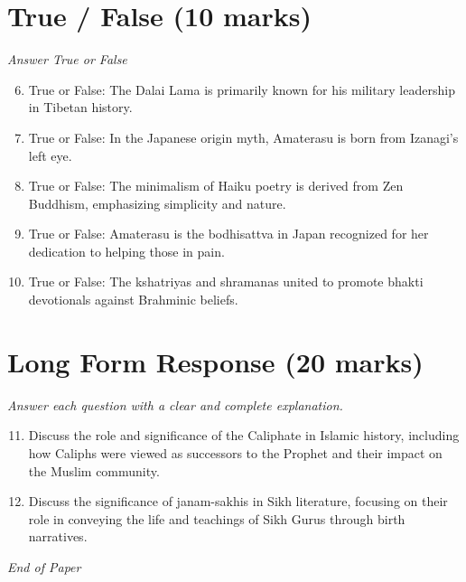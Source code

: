 \documentclass[12pt]{article}
\begin{document}
\section*{True / False (10 marks)}
\textit{Answer True or False}
\begin{enumerate}[label=\arabic*.]
\setcounter{enumi}{5}
\item True or False: The Dalai Lama is primarily known for his military leadership in Tibetan history.
\item True or False: In the Japanese origin myth, Amaterasu is born from Izanagi's left eye.
\item True or False: The minimalism of Haiku poetry is derived from Zen Buddhism, emphasizing simplicity and nature.
\item True or False: Amaterasu is the bodhisattva in Japan recognized for her dedication to helping those in pain.
\item True or False: The kshatriyas and shramanas united to promote bhakti devotionals against Brahminic beliefs.
\end{enumerate}

\section*{Long Form Response (20 marks)}
\textit{Answer each question with a clear and complete explanation.}
\begin{enumerate}[label=\arabic*.]
\setcounter{enumi}{10}
\item Discuss the role and significance of the Caliphate in Islamic history, including how Caliphs were viewed as successors to the Prophet and their impact on the Muslim community.
\item Discuss the significance of janam-sakhis in Sikh literature, focusing on their role in conveying the life and teachings of Sikh Gurus through birth narratives.
\end{enumerate}

\vfill
\noindent\textit{End of Paper}
\end{document}
